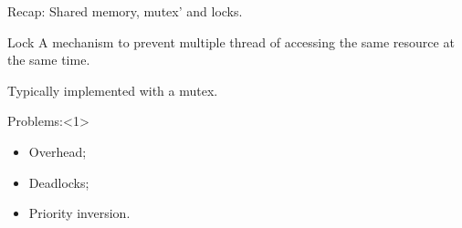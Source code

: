 \begin{frame}{Recap: Shared memory, mutex' and locks.}
	\begin{block}{Lock}
		A mechanism to prevent multiple thread of accessing the same resource at the same time. 
	\end{block}
	Typically implemented with a mutex. 

	\begin{exampleblock}{Problems:}<1>
		\begin{itemize}
			\item Overhead;
			\item Deadlocks;
			\item Priority inversion.
		\end{itemize}
	\end{exampleblock}

\end{frame}



